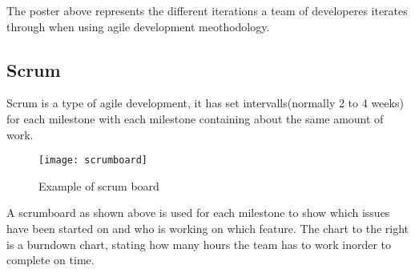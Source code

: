 The poster above represents the different iterations a team of developeres iterates through when using agile development meothodology.

\subsection{Scrum}
Scrum is a type of agile development, it has set intervalls(normally 2 to 4 weeks) for each milestone with each milestone containing about the same amount of work.

\begin{figure}[h!]
\label{logo}
\centering
	\texttt{[image: scrumboard]}
\caption{Example of scrum board}
\end{figure}

A scrumboard as shown above is used for each milestone to show which issues have been started on and who is working on which feature. The chart to the right is a burndown chart, stating how many hours the team has to work inorder to complete on time.